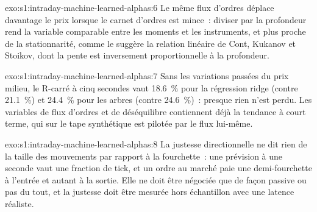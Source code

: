 \begin{solution}{exo:s1:intraday-machine-learned-alphas:6}
Le même flux d'ordres déplace davantage le prix lorsque le carnet d'ordres est mince~: diviser par la profondeur rend la variable comparable entre les moments et les instruments, et plus proche
de la stationnarité, comme le suggère la relation linéaire de Cont, Kukanov et Stoikov, dont la pente est inversement proportionnelle à la profondeur.
\end{solution}

\begin{solution}{exo:s1:intraday-machine-learned-alphas:7}
Sans les variations passées du prix milieu, le R-carré à cinq secondes vaut 18.6~\% pour la régression ridge (contre 21.1~\%) et 24.4~\% pour les arbres (contre 24.6~\%)~: presque rien n'est perdu.
Les variables de flux d'ordres et de déséquilibre contiennent déjà la tendance à court terme, qui sur le tape synthétique est pilotée par le flux lui-même.
\end{solution}

\begin{solution}{exo:s1:intraday-machine-learned-alphas:8}
La justesse directionnelle ne dit rien de la taille des mouvements par rapport à la fourchette~: une prévision à une seconde vaut une fraction de tick, et un ordre au marché paie
une demi-fourchette à l'entrée et autant à la sortie. Elle ne doit être négociée que de façon passive ou pas du tout, et la justesse doit être mesurée hors échantillon avec une latence réaliste.
\end{solution}

